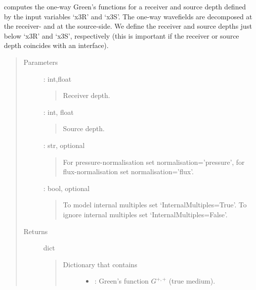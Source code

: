 \documentclass[letterpaper,10pt,english]{sphinxmanual}
\begin{document}
\begin{fulllineitems}
\begin{fulllineitems}
\end{fulllineitems}


\begin{fulllineitems}
\label{\detokenize{Layered_NRM_p_w:Layered_NRM_p_w.Layered_NRM_p_w.GreensFunction_p_w}}
computes the one-way Green’s functions for a receiver and source depth defined by the input variables ‘x3R’ and ‘x3S’. The one-way wavefields are decomposed at the receiver- and at the source-side. We define the receiver and source depths just below ‘x3R’ and ‘x3S’, respectively (this is important if the receiver or source depth coincides with an interface).
\begin{quote}\begin{description}
\item[{Parameters}] \leavevmode
{} : int,float
\begin{quote}

Receiver depth.
\end{quote}

 : int, float
\begin{quote}

Source depth.
\end{quote}

 : str, optional
\begin{quote}

For pressure-normalisation set normalisation=’pressure’, for flux-normalisation set normalisation=’flux’.
\end{quote}

 : bool, optional
\begin{quote}

To model internal multiples set ‘InternalMultiples=True’. To ignore internal multiples set ‘InternalMultiples=False’.
\end{quote}

\item[{Returns}] \leavevmode
dict
\begin{quote}
\begin{description}
\item[{Dictionary that contains }] \leavevmode\begin{itemize}
\item {} 
: Green’s function \(G^{+,+}\) (true medium).


\end{itemize}
\end{description}
\end{quote}
\end{description}
\end{quote}
\end{fulllineitems}
\end{fulllineitems}
\end{document}
